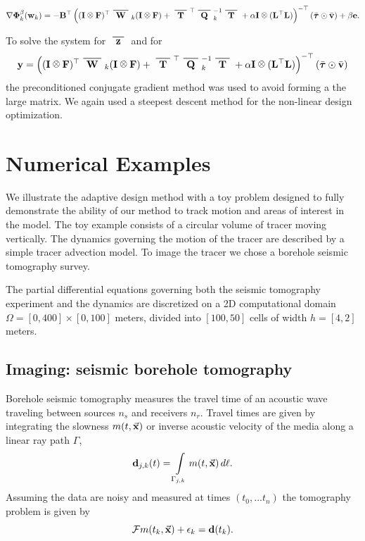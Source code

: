 \documentclass[11pt]{article}
\begin{document}
\begin{equation}
\nabla \bfPhi_k^{\beta}(\bfw_k) = -\bfB^{\top}\left((\bfI \kronecker \bfF)^{\top}\Wbar_k(\bfI \kronecker \bfF)  +
\Tbar^{\top}\Qbar^{-1}_k\Tbar + \alpha \bfI \kronecker(\LtL)
\right)^{- \top}(\bar{\bftau} \odot \bar{\bfv}) + \beta\bfe.
\end{equation}

To solve the system for $\zbar$ and for
\begin{equation}
\bfy = \left((\bfI \kronecker \bfF)^{\top}\Wbar_k(\bfI \kronecker \bfF)  +
\Tbar^{\top}\Qbar^{-1}_k\Tbar + \alpha \bfI \kronecker(\LtL)
\right)^{- \top}(\bar{\bftau} \odot \bar{\bfv}) 
\end{equation}
the preconditioned conjugate gradient method was used 
to avoid forming a the large matrix. We again used a steepest descent method for the non-linear design optimization. 


\section{Numerical Examples }
\label{sec: Example1}
We illustrate the adaptive  design method  with a toy problem designed to fully demonstrate the ability of our method to track  motion and areas of interest in the model. The toy  example consists of a  circular volume of tracer  moving vertically. The dynamics governing the motion of the tracer are described by a simple tracer  advection model. 
To image the tracer we chose a   borehole seismic tomography survey.

The partial differential equations governing both the seismic tomography experiment and the dynamics are discretized on a  2D computational domain  $\Omega=[0, 400] \times [0, 100]$ meters,  divided into $[100, 50]$ cells of width $h = [4,2]$ meters.


\subsection{Imaging: seismic borehole tomography}
 Borehole seismic tomography  measures the travel time of an acoustic wave traveling between sources $n_s$ and receivers $n_r$. Travel times are given by integrating the slowness  $m(t,\vec {\bf x})$  or inverse acoustic velocity of the media  along a linear ray path $\Gamma$,
\begin{equation}\label{eq:tomo}
{\bf{d}}_{j,k}(t) =  \int\limits_{\Gamma_{j,k}} m(t,\vec {\bf x})\, d\ell.
\end{equation}
 Assuming the data are noisy and measured at times $(t_0,...t_n)$ the tomography problem is given by 
 \begin{equation*}
 \mathcal{F} m(t_{k},\vec {\bf x}) + \epsilon_{k}  = {\bf{d}}(t_{k}).\\
\end{equation*}
\end{document}
